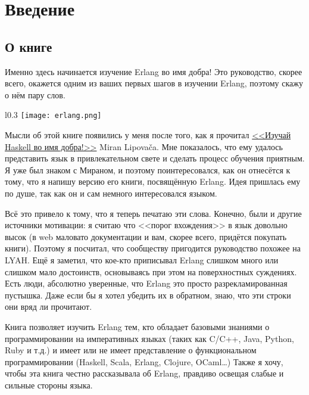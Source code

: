 \chapter{Введение}\label{introduction}

\section{О книге}

Именно здесь начинается изучение Erlang во имя добра!
Это руководство, скорее всего, окажется одним из ваших первых шагов в изучении Erlang, поэтому скажу о нём пару слов.

\begin{wrapfigure}{l}{0.3\linewidth}
    \texttt{[image: erlang.png]}
\end{wrapfigure}

Мысли об этой книге появились у меня после того, как я прочитал \href{http://learnyouahaskell.com}{<<Изучай Haskell во имя добра!>>} Miran Lipova\v{c}a.
Мне показалось, что ему удалось представить язык в привлекательном свете и сделать процесс обучения приятным.
Я уже был знаком с Мираном, и поэтому поинтересовался, как он отнесётся к тому, что я напишу версию его книги, посвящённую Erlang.
Идея пришлась ему по душе, так как он и сам немного интересовался языком.

Всё это привело к тому, что я теперь печатаю эти слова.
Конечно, были и другие источники мотивации: я считаю что <<порог вхождения>> в язык довольно высок (в web маловато документации и вам, скорее всего, придётся покупать книги).
Поэтому я посчитал, что сообществу пригодится руководство похожее на LYAH.
Ещё я заметил, что кое\--кто приписывал Erlang слишком много или слишком мало достоинств, основываясь при этом на поверхностных суждениях.
Есть люди, абсолютно уверенные, что Erlang это просто разрекламированная пустышка.
Даже если бы я хотел убедить их в обратном, знаю, что эти строки они вряд ли прочитают.

Книга позволяет изучить Erlang тем, кто обладает базовыми знаниями о программировании на императивных языках (таких как C/C++, Java, Python, Ruby и т.д.) и имеет или не имеет представление о функциональном программировании (Haskell, Scala, Erlang, Clojure, OCaml\ldots)
Также я хочу, чтобы эта книга честно рассказывала об Erlang, правдиво освещая слабые и сильные стороны языка.

